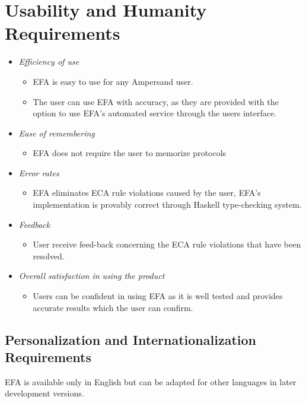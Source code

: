 \documentclass[12pt]{report}
\begin{document}
\section{Usability and Humanity Requirements}\label{sec:Usability}

\begin{itemize}
    \item \textit{Efficiency of use} 
        \begin{itemize}
           \item EFA is easy to use for any Ampersand user.
           \item The user can use EFA with accuracy, as they are provided with 
           the option to use EFA's automated service through the users 
           interface.
        \end{itemize}
    \item \textit{Ease of remembering}  
        \begin{itemize}
            \item EFA does not require the user to memorize protocols
        \end{itemize}
    \item \textit{Error rates} 
        \begin{itemize}
            \item EFA eliminates ECA rule violations caused by the user, 
            EFA's implementation is provably correct through Haskell 
            type-checking system.
        \end{itemize}
       
    \item \textit{Feedback} 
        \begin{itemize}
            \item User receive feed-back concerning the ECA rule 
            violations that have been resolved.
        \end{itemize}
    \item \textit{Overall satisfaction in using the product} 
    \begin{itemize}
        \item Users can be confident in using EFA as it is well tested and 
        provides accurate results which the user can confirm.
    \end{itemize}
\end{itemize}

\subsection{Personalization and Internationalization 
Requirements}\label{subsec:Personalization}
EFA is available only in English but can be adapted for other languages in 
later development versions.
\end{document}
